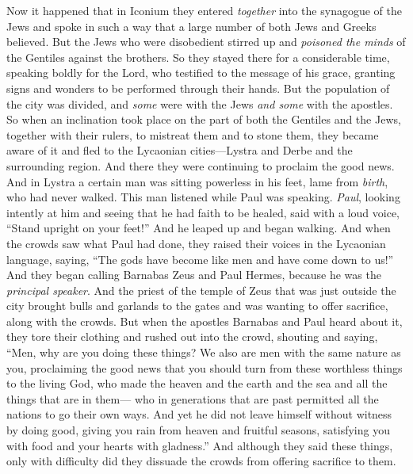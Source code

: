 \begin{biblechapter} %
 Now it happened that in Iconium they entered \textit{together} into the synagogue of the Jews and spoke in such a way that a large number of both Jews and Greeks believed.
\verse But the Jews who were disobedient stirred up and \textit{poisoned the minds} of the Gentiles against the brothers.
\verse So they stayed there for a considerable time, speaking boldly for the Lord, who testified to the message of his grace, granting signs and wonders to be performed through their hands.
\verse But the population of the city was divided, and \textit{some} were with the Jews \textit{and some} with the apostles.
\verse So when an inclination took place on the part of both the Gentiles and the Jews, together with their rulers, to mistreat them and to stone them,
\verse they became aware of it and fled to the Lycaonian cities—Lystra and Derbe and the surrounding region.
\verse And there they were continuing to proclaim the good news.
 And in Lystra a certain man was sitting powerless in his feet, lame from \textit{birth}, who had never walked.
\verse This man listened while Paul was speaking. \textit{Paul}, looking intently at him and seeing that he had faith to be healed,
\verse said with a loud voice, “Stand upright on your feet!” And he leaped up and began walking.
\verse And when the crowds saw what Paul had done, they raised their voices in the Lycaonian language, saying, “The gods have become like men and have come down to us!”
\verse And they began calling Barnabas Zeus and Paul Hermes, because he was the \textit{principal speaker}.
\verse And the priest of the temple of Zeus that was just outside the city brought bulls and garlands to the gates and was wanting to offer sacrifice, along with the crowds.
\verse But when the apostles Barnabas and Paul heard about it, they tore their clothing and rushed out into the crowd, shouting
\verse and saying, “Men, why are you doing these things? We also are men with the same nature as you, proclaiming the good news that you should turn from these worthless things to the living God, who made the heaven and the earth and the sea and all the things that are in them—
\verse who in generations that are past permitted all the nations to go their own ways.
\verse And yet he did not leave himself without witness by doing good, giving you rain from heaven and fruitful seasons, satisfying you with food and your hearts with gladness.”
\verse And although they said these things, only with difficulty did they dissuade the crowds from offering sacrifice to them.

\end{biblechapter}
